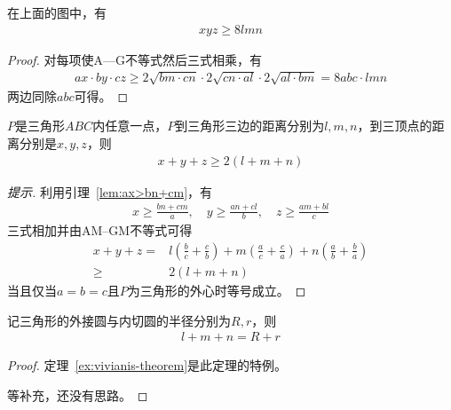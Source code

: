 \begin{lemma}
  在上面的图中，有
  \begin{align*}
    xyz\ge 8 lmn
  \end{align*}
\end{lemma}
\begin{proof}
  对每项使A—G不等式然后三式相乘，有
  \begin{align*}
    ax\cdot by\cdot cz \ge 2\sqrt{bm\cdot cn} \cdot 2\sqrt{cn\cdot al} \cdot 2\sqrt{al\cdot bm}
    = 8abc \cdot lmn
  \end{align*}
  两边同除$abc$可得。
\end{proof}


\begin{theorem}
  $P$是三角形$ABC$内任意一点，$P$到三角形三边的距离分别为$l,m,n$，到三顶点的距离分别是$x,y,z$，则
  \begin{align}
    x+y+z\ge 2(l+m+n)
  \end{align}
\end{theorem}
\begin{proof}[提示]
  利用引理~\ref{lem:ax>bn+cm}，有
  \begin{align*}
    x \ge \frac{bn + cm}{a}, \quad y \ge \frac{an + cl}{b}, \quad z \ge \frac{am + bl}{c}
  \end{align*}
  三式相加并由AM--GM不等式可得
  \begin{align*}
    x + y + z ={}& l\left(\frac bc + \frac cb\right) + m\left(\frac ac + \frac ca\right) + n\left(\frac ab + \frac ba\right)\\
    \ge{}& 2(l + m + n)
  \end{align*}
  当且仅当$a=b=c$且$P$为三角形的外心时等号成立。
\end{proof}

\begin{theorem}
  记三角形的外接圆与内切圆的半径分别为$R,r$，则
  \begin{align*}
    l + m + n = R + r
  \end{align*}
\end{theorem}
\begin{proof}定理~\ref{ex:vivianis-theorem}是此定理的特例。

  \color{red}等补充，还没有思路。
\end{proof}